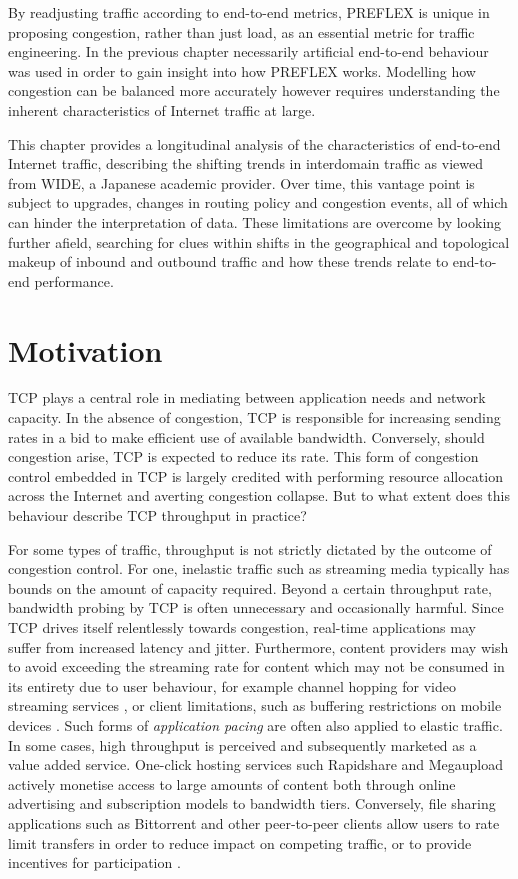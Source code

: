 By readjusting traffic according to end-to-end metrics, \ac{PREFLEX} is unique in proposing congestion, rather than just load, as an essential metric for traffic engineering.
In the previous chapter necessarily artificial end-to-end behaviour was used in order to gain insight into how \ac{PREFLEX} works.
Modelling how congestion can be balanced more accurately however requires understanding the inherent characteristics of Internet traffic at large.

This chapter provides a longitudinal analysis of the characteristics of end-to-end Internet traffic, describing the shifting trends in interdomain traffic as viewed from WIDE, a Japanese academic provider.
Over time, this vantage point is subject to upgrades, changes in routing policy and congestion events, all of which can hinder the interpretation of data.
These limitations are overcome by looking further afield, searching for clues within shifts in the geographical and topological makeup of inbound and outbound traffic and how these trends relate to end-to-end performance.

\section{Motivation}

TCP plays a central role in mediating between application needs and network capacity.
In the absence of congestion, TCP is responsible for increasing sending rates in a bid to make efficient use of available bandwidth.
Conversely, should congestion arise, TCP is expected to reduce its rate.
This form of congestion control embedded in TCP is largely credited with performing resource allocation across the Internet and averting congestion collapse.
But to what extent does this behaviour describe TCP throughput in practice?

For some types of traffic, throughput is not strictly dictated by the outcome of congestion control.
For one, inelastic traffic such as streaming media typically has bounds on the amount of capacity required.
Beyond a certain throughput rate, bandwidth probing by TCP is often unnecessary and occasionally harmful.
Since TCP drives itself relentlessly towards congestion, real-time applications may suffer from increased latency and jitter.
Furthermore, content providers may wish to avoid exceeding the streaming rate for content which may not be consumed in its entirety due to user behaviour, for example channel hopping for video streaming services \cite{iptvWorkload}, or client limitations, such as buffering restrictions on mobile devices \cite{Rao:2011p547}.
Such forms of \emph{application pacing} are often also applied to elastic traffic.
In some cases, high throughput is perceived and subsequently marketed as a value added service.
One-click hosting services such Rapidshare and Megaupload \cite{oneclick1, SanjuasCuxart:2012p588} actively monetise access to large amounts of content both through online advertising and subscription models to bandwidth tiers.
Conversely, file sharing applications such as Bittorrent and other peer-to-peer clients allow users to rate limit transfers in order to reduce impact on competing traffic, or to provide incentives for participation \cite{bittorrentIMC}.

